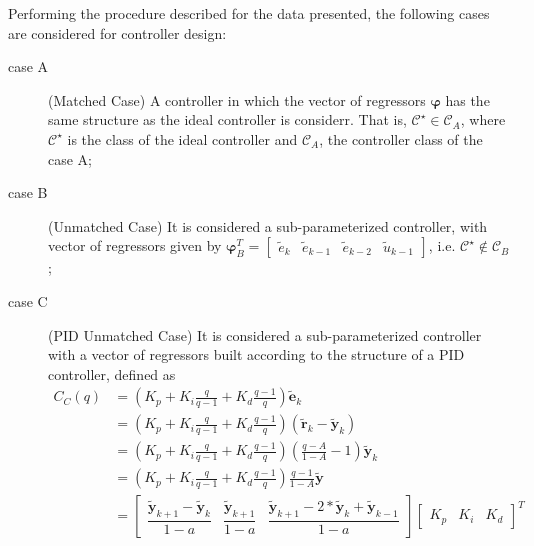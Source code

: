 \begin{exmp}
   Performing the procedure described for the data presented, the following cases are considered for controller design:
   \begin{description}
      \item[case A] (Matched Case) A controller in which the vector of regressors $\bm{\varphi}$ has the same structure as the ideal controller is considerr. That is, $\mathscr{C}^{\star} \in \mathscr{C}_A$, where $\mathscr{C}^{\star}$ is the class of the ideal controller and $\mathscr{C}_{A}$, the controller class of the case A;
      \item[case B] (Unmatched Case) It is considered a sub-parameterized controller, with vector of regressors given by $ \bm{\varphi}^T_B =\begin{bmatrix} \tilde{e}_k & \tilde{e}_{k-1} & \tilde{e}_{k-2} & \tilde{u}_{k-1} \end{bmatrix}$, i.e. $\mathscr{C}^\star \not\in \mathscr{C}_B $;
      \item[case C] (PID Unmatched Case) It is considered a sub-parameterized controller with a vector of regressors built according to the structure of a PID controller, defined as
         \begin{align}
            C_{C}(q) &= \left(K_p + K_i\frac{q}{q-1} + K_d\frac{q-1}{q}\right)\tilde{\bm{e}}_k \nonumber \\
                     &= \left(K_p + K_i\frac{q}{q-1} + K_d\frac{q-1}{q}\right)\left(\tilde{\bm{r}}_k-\tilde{\bm{y}}_k\right) \nonumber \\
                     &= \left(K_p + K_i\frac{q}{q-1} + K_d\frac{q-1}{q}\right)\left(\frac{q-A}{1-A}-1\right)\tilde{\bm{y}}_k \nonumber \\
                     &= \left(K_p + K_i\frac{q}{q-1} + K_d\frac{q-1}{q}\right)\frac{q-1}{1-A}\tilde{\bm{y}} \nonumber \\
                     &= \begin{bmatrix} 
                        \dfrac{\tilde{\bm{y}}_{k+1}-\tilde{\bm{y}}_k}{1-a} & 
                        \dfrac{\tilde{\bm{y}}_{k+1}}{1-a} &
                        \dfrac{\tilde{\bm{y}}_{k+1}-2*\tilde{\bm{y}}_k+\tilde{\bm{y}}_{k-1}}{1-a} 
                     \end{bmatrix} 
            \begin{bmatrix}  K_p & K_i & K_d  \end{bmatrix}^T   
            \label{eq:} 
         \end{align}

\end{description}
\end{exmp}

